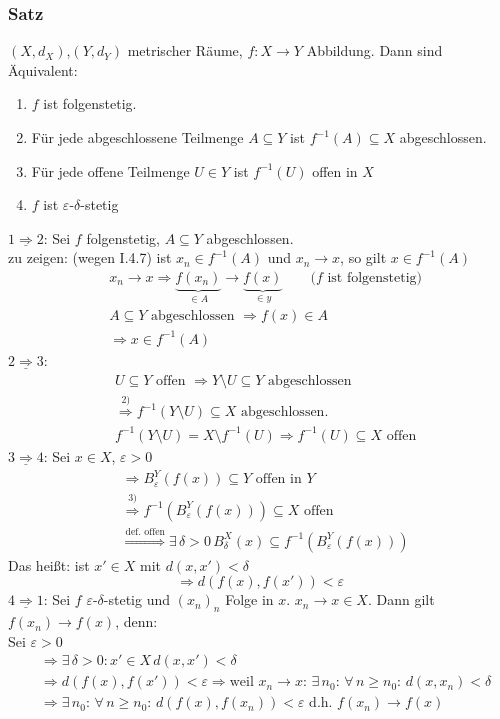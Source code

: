 \subsubsection{Satz} %
\label{ssub:satz}
$(X,d_X)$,$(Y,d_Y)$ metrischer Räume, $f: X \to Y$ Abbildung. Dann sind Äquivalent:
\begin{enumerate}
	\item $f$ ist folgenstetig.
	\item Für jede abgeschlossene Teilmenge $A \subseteq Y$ ist $f^{-1}(A) \subseteq X$ abgeschlossen.
	\item Für jede offene Teilmenge $U \in Y$ ist $f^{-1}(U)$ offen in $X$
	\item $f$ ist $\varepsilon$-$\delta$-stetig
\end{enumerate}
$\underline{1 \Rightarrow 2}$: Sei $f$ folgenstetig, $A \subseteq Y$ abgeschlossen. \\
zu zeigen: (wegen I.4.7) ist $x_n \in f^{-1}(A)$ und $x_n \to x$, so gilt $x \in f^{-1}(A)$ \\
\begin{align*}
	&x_n \to x \Rightarrow \underset{\in A}{\underbrace{f(x_n)}} \to \underset{\in y}{\underbrace{f(x)}} \qquad \text{($f$ ist folgenstetig)} \\
	&A \subseteq Y \text{ abgeschlossen } \Rightarrow  f(x) \in A \\
 	&\Rightarrow x \in f^{-1}(A) 
\end{align*}
$\underline{2 \Rightarrow 3}$:
\begin{align*}
	&U \subseteq Y \text{ offen } \Rightarrow Y \setminus U \subseteq Y \text{ abgeschlossen} \\
	&\stackrel{2)}{\Rightarrow} f^{-1}(Y \setminus U) \subseteq  X \text{ abgeschlossen.} \\
	&f^{-1}(Y \setminus U) = X \setminus f^{-1}(U) \Rightarrow f^{-1}(U) \subseteq  X \text{ offen}
\end{align*}
$\underline{3 \Rightarrow 4}$:
Sei $x \in X$, $\varepsilon>0$ 
\begin{align*}
	&\Rightarrow B_{\varepsilon}^Y(f(x)) \subseteq Y \text{ offen in } Y \\
	&\stackrel{3)}{\Rightarrow} f^{-1}(B_{\varepsilon}^Y(f(x))) \subseteq X \text{ offen} \\
	&\stackrel{\text{def. offen}}{\Rightarrow} \exists\, \delta >0 \, B_{\delta}^X(x) \subseteq f^{-1}(B_{\varepsilon}^Y(f(x)))
\end{align*}
Das heißt: ist $x' \in X$ mit $d(x,x')<\delta$
\[
	\Rightarrow d(f(x),f(x'))<\varepsilon
\]
$\underline{4 \Rightarrow 1}$:
Sei $f$ $\varepsilon$-$\delta$-stetig und $(x_n)_n$ Folge in $x$. $x_n \to x \in X$. Dann gilt $f(x_n) \to f(x)$, denn: \\
Sei $\varepsilon>0$
\begin{align*}
	&\Rightarrow \exists\,\delta >0: x' \in X \, d(x,x')< \delta \\
	&\Rightarrow d(f(x),f(x'))<\varepsilon \Rightarrow \text{weil } x_n \to x: \, \exists\,n_0: \, \forall\, n \geq n_0: \, d(x,x_n)<\delta \\
	&\Rightarrow \exists\,n_0: \, \forall\, n \geq n_0: \, d(f(x),f(x_n))<\varepsilon \text{ d.h. } f(x_n) \to f(x)
\end{align*}

